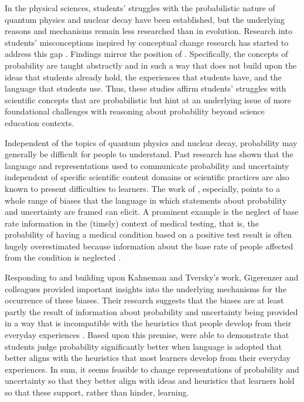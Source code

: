 \documentclass[man]{apa7}
\begin{document}
In the physical sciences, students' struggles with the probabilistic nature of quantum physics \parencite{br02} and nuclear decay \parencite{smmv17} have been established, but the underlying reasons and mechanisms remain less researched than in evolution. Research into students’ misconceptions inspired by conceptual change research has started to address this gap \parencite{ms15, alra14, st09}. Findings mirror the position of \textcite{bgv94}. Specifically, the concepts of probability are taught abstractly and in such a way that does not build upon the ideas that students already hold, the experiences that students have, and the language that students use. Thus, these studies affirm students' struggles with scientific concepts that are probabilistic but hint at an underlying issue of more foundational challenges with reasoning about probability beyond science education contexts. 

Independent of the topics of quantum physics and nuclear decay, probability may generally be difficult for people to understand. Past research has shown that the language and representations used to communicate probability and uncertainty independent of specific scientific content domains or scientific practices are also known to present difficulties to learners. The work of \textcite{tk74}, especially, points to a whole range of biases that the language in which statements about probability and uncertainty are framed can elicit. A prominent example is the neglect of base rate information in the (timely) context of medical testing, that is, the probability of having a medical condition based on a positive test result is often hugely overestimated because information about the base rate of people affected from the condition is neglected \parencite{kahneman_thinking_2012}.

Responding to and building upon Kahneman and Tversky's work, Gigerenzer and colleagues provided important insights into the underlying mechanisms for the occurrence of these biases. Their research suggests that the biases are at least partly the result of information about probability and uncertainty being provided in a way that is incompatible with the heuristics that people develop from their everyday experiences \parencite{gh95, jkg18}. Based upon this premise, \textcite{jkg18} were able to demonstrate that students judge probability significantly better when language is adopted that better aligns with the heuristics that most learners develop from their everyday experiences. In sum, it seems feasible to change representations of probability and uncertainty so that they better align with ideas and heuristics that learners hold so that these support, rather than hinder, learning.
\end{document}
